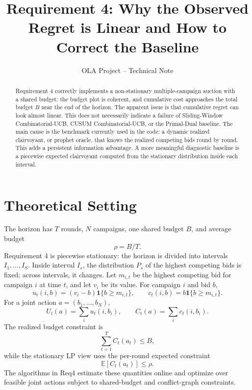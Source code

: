 \documentclass[10pt,a4paper]{article}
\title{\vspace{-1.4em}\textbf{Requirement 4: Why the Observed Regret is Linear and How to Correct the Baseline}}
\author{OLA Project -- Technical Note}
\date{}
\newcommand{\E}{\mathbb{E}}
\newcommand{\1}{\mathbf{1}}
\begin{document}
\maketitle
\vspace{-1.6em}

\begin{abstract}
\noindent Requirement 4 correctly implements a non-stationary multiple-campaign auction with a shared budget: the budget plot is coherent, and cumulative cost approaches the total budget $B$ near the end of the horizon. The apparent issue is that cumulative regret can look almost linear. This does not necessarily indicate a failure of Sliding-Window Combinatorial-UCB, CUSUM Combinatorial-UCB, or the Primal-Dual baseline. The main cause is the benchmark currently used in the code: a dynamic realized clairvoyant, or prophet oracle, that knows the realized competing bids round by round. This adds a persistent information advantage. A more meaningful diagnostic baseline is a piecewise expected clairvoyant computed from the stationary distribution inside each interval.
\end{abstract}

\section{Theoretical Setting}
The horizon has $T$ rounds, $N$ campaigns, one shared budget $B$, and average budget
\[
  \rho = B/T .
\]
Requirement 4 is piecewise stationary: the horizon is divided into intervals $I_1,\ldots,I_S$. Inside interval $I_s$, the distribution $P_s$ of the highest competing bids is fixed; across intervals, it changes. Let $m_{i,t}$ be the highest competing bid for campaign $i$ at time $t$, and let $v_i$ be its value. For campaign $i$ and bid $b$,
\[
  u_t(i,b)=(v_i-b)\1\{b\ge m_{i,t}\},\qquad
  c_t(i,b)=b\1\{b\ge m_{i,t}\}.
\]
For a joint action $a=(b_1,\ldots,b_N)$,
\[
  U_t(a)=\sum_i u_t(i,b_i),\qquad
  C_t(a)=\sum_i c_t(i,b_i).
\]
The realized budget constraint is
\[
  \sum_{t=1}^T C_t(a_t)\le B,
\]
while the stationary LP view uses the per-round expected constraint
\[
  \E[C_t(a_t)]\le \rho .
\]
The algorithms in Req4 estimate these quantities online and optimize over feasible joint actions subject to shared-budget and conflict-graph constraints.
\end{document}
